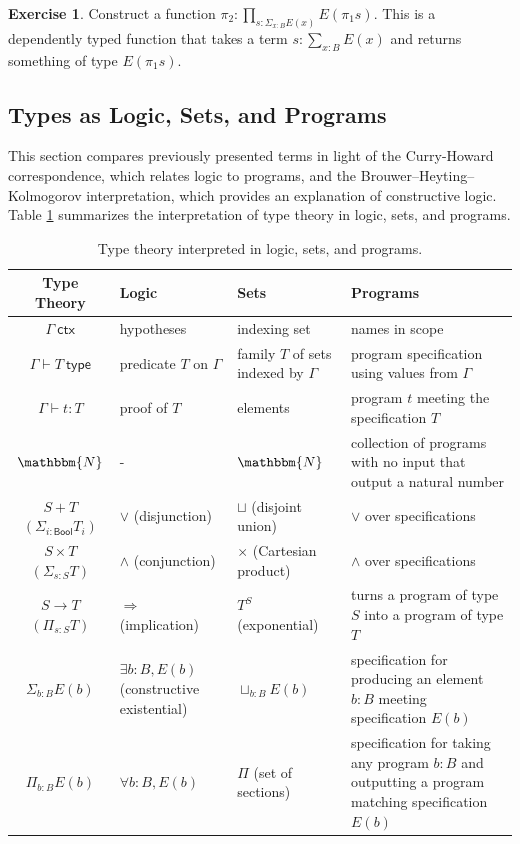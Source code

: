 \documentclass{amsart}
\theoremstyle{definition}
\newtheorem{ex}{Exercise}[section]
\newcommand{\N}{\mathbbm{N}}
\newcommand{\ctx}{\ensuremath{\mathsf{~ctx}}}
\newcommand{\type}{\ensuremath{\mathsf{~type}}}
\newcommand{\Bool}{\ensuremath{\mathsf{Bool}}}
\begin{document}
\begin{ex}
Construct a function $\pi_2 : \prod_{s : \Sigma_{x : B} E(x)} E(\pi_1 s)$. This is a dependently typed function that takes a term $s : \sum_{x : B} E(x)$ and returns something of type $E(\pi_1 s)$.
\end{ex}

\subsection{Types as Logic, Sets, and Programs}
This section compares previously presented terms in light of the Curry-Howard correspondence, which relates logic to programs, and the Brouwer–Heyting–Kolmogorov interpretation, which provides an explanation of constructive logic. 
Table \ref{tb:types-as-logic-sets-programs} summarizes the interpretation of type theory in logic, sets, and programs.

\begin{table}[h]
    \centering
    \begin{tabular}{|c||p{}|p{}|p{}|}\hline
        Type Theory & Logic & Sets & Programs \\\hline
        $\Gamma \ctx$ & hypotheses & indexing set & names in scope \\\hline
        $\Gamma \vdash T \type$ & predicate $T$ on $\Gamma$ & family $T$ of sets indexed by $\Gamma$ & program specification using values from $\Gamma$\\\hline
        $\Gamma \vdash t : T$ & proof of $T$ & elements & program $t$ meeting the specification $T$\\\hline
        $\N$ & - & $\N$ & collection of programs with no input that output a natural number \\\hline
        $S + T$  $(\Sigma_{i : \Bool} T_i)$ & $\vee$ (disjunction) & $\sqcup$ (disjoint union) & $\vee$ over specifications \\\hline
        $S \times T$  $(\Sigma_{s : S} T)$ & $\wedge$ (conjunction) & $\times$ (Cartesian product) & $\wedge$ over specifications \\\hline
        $S \rightarrow T$  $(\Pi_{s : S} T)$ & $\Rightarrow$ (implication) & $T^S$ (exponential) & turns a program of type $S$ into a program of type $T$ \\\hline
        $\Sigma_{b : B} E(b)$ & $\exists b:B, E(b)$ (constructive existential) & $\sqcup_{b : B}E(b)$ & specification for producing an element $b : B$ meeting specification $E(b)$ \\\hline
        $\Pi_{b : B} E(b)$ & $\forall b : B, E(b)$ & $\Pi$ (set of sections) & specification for taking any program $b : B$ and outputting a program matching specification $E(b)$ \\\hline
    \end{tabular}
    \caption{Type theory interpreted in logic, sets, and programs.}
    \label{tb:types-as-logic-sets-programs}
\end{table}
\end{document}
